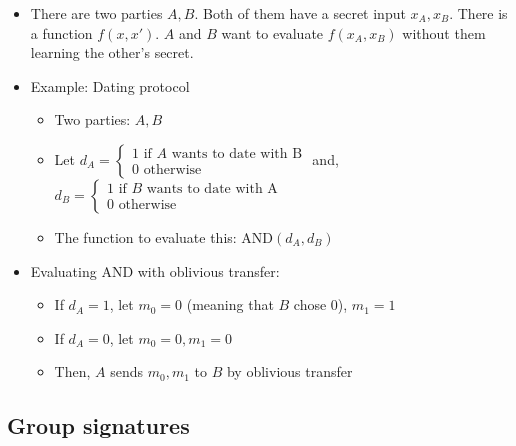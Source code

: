 \documentclass[11pt]{article}
\theoremstyle{definition}
\theoremstyle{proof}
\begin{document}
\begin{itemize}
	\item There are two parties $A, B$. Both of them have a secret input $x_A, x_B$. There is a function $f(x, x')$. $A$ and $B$ want to evaluate $f(x_A, x_B)$ without them learning the other's secret.
	\item Example: Dating protocol
	\begin{itemize}
		\item Two parties: $A, B$
		\item Let $d_A = \begin{cases}
			1 \text{ if } A \text{ wants to date with B} \\
			0 \text{ otherwise}
		\end{cases}$ and, $d_B = \begin{cases}
		1 \text{ if } B \text{ wants to date with A} \\
		0 \text{ otherwise}
		\end{cases}$
		\item The function to evaluate this: $\text{AND}(d_A, d_B)$
	\end{itemize}
	\item Evaluating AND with oblivious transfer:
	\begin{itemize}
		\item If $d_A = 1$, let $m_0 = 0$ (meaning that $B$ chose $0$), $m_1 = 1$
		\item If $d_A = 0$, let $m_0 = 0, m_1 = 0$
		\item Then, $A$ sends $m_0, m_1$ to $B$ by oblivious transfer
	\end{itemize}
\end{itemize}

\subsection{Group signatures}
\end{document}
